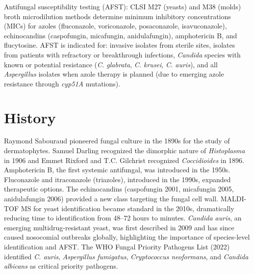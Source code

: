 Antifungal susceptibility testing (AFST): CLSI M27 (yeasts) and M38 (molds) broth microdilution methods determine minimum inhibitory concentrations (MICs) for azoles (fluconazole, voriconazole, posaconazole, isavuconazole), echinocandins (caspofungin, micafungin, anidulafungin), amphotericin B, and flucytosine. AFST is indicated for: invasive isolates from sterile sites, isolates from patients with refractory or breakthrough infections, \textit{Candida} species with known or potential resistance (\textit{C. glabrata}, \textit{C. krusei}, \textit{C. auris}), and all \textit{Aspergillus} isolates when azole therapy is planned (due to emerging azole resistance through \textit{cyp51A} mutations).

\section*{History}
Raymond Sabouraud pioneered fungal culture in the 1890s for the study of dermatophytes. Samuel Darling recognized the dimorphic nature of \textit{Histoplasma} in 1906 and Emmet Rixford and T.C. Gilchrist recognized \textit{Coccidioides} in 1896. Amphotericin B, the first systemic antifungal, was introduced in the 1950s. Fluconazole and itraconazole (triazoles), introduced in the 1990s, expanded therapeutic options. The echinocandins (caspofungin 2001, micafungin 2005, anidulafungin 2006) provided a new class targeting the fungal cell wall. MALDI-TOF MS for yeast identification became standard in the 2010s, dramatically reducing time to identification from 48--72 hours to minutes. \textit{Candida auris}, an emerging multidrug-resistant yeast, was first described in 2009 and has since caused nosocomial outbreaks globally, highlighting the importance of species-level identification and AFST. The WHO Fungal Priority Pathogens List (2022) identified \textit{C. auris}, \textit{Aspergillus fumigatus}, \textit{Cryptococcus neoformans}, and \textit{Candida albicans} as critical priority pathogens.


